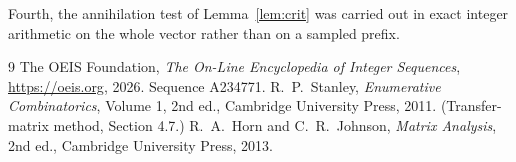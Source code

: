 \documentclass[11pt,a4paper]{article}
\theoremstyle{plain}
\theoremstyle{definition}
\begin{document}
Fourth, the annihilation test of Lemma~\ref{lem:crit} was carried out in exact integer
arithmetic on the whole vector rather than on a sampled prefix.

\begin{thebibliography}{9}
 The OEIS Foundation, \emph{The On-Line Encyclopedia of Integer
Sequences}, \url{https://oeis.org}, 2026. Sequence A234771.
 R.~P.~Stanley, \emph{Enumerative Combinatorics}, Volume 1, 2nd ed.,
Cambridge University Press, 2011. (Transfer-matrix method, Section 4.7.)
 R.~A.~Horn and C.~R.~Johnson, \emph{Matrix Analysis}, 2nd ed., Cambridge
University Press, 2013.
\end{thebibliography}
\end{document}
